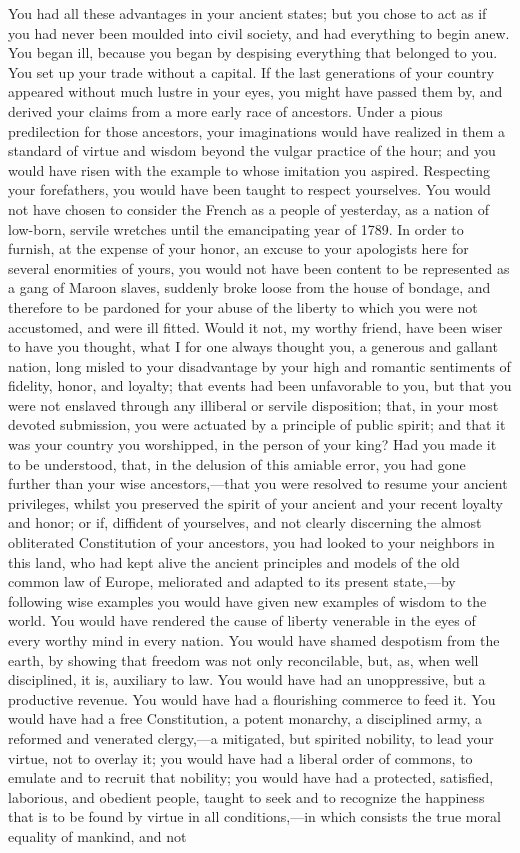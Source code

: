 You had all these advantages in your ancient states; but you chose to act as if you had never been moulded into civil society, and had everything to begin anew. You began ill, because you began by despising everything that belonged to you. You set up your trade without a capital. If the last generations of your country appeared without much lustre in your eyes, you might have passed them by, and derived your claims from a more early race of ancestors. Under a pious predilection for those ancestors, your imaginations would have realized in them a standard of virtue and wisdom beyond the vulgar practice of the hour; and you would have risen with the example to whose imitation you aspired. Respecting your forefathers, you would have been taught to respect yourselves. You would not have chosen to consider the French as a people of yesterday, as a nation of low-born, servile wretches until the emancipating year of 1789. In order to furnish, at the expense of your honor, an excuse to your apologists here for several enormities of yours, you would not have been content to be represented as a gang of Maroon slaves, suddenly broke loose from the house of bondage, and therefore to be pardoned for your abuse of the liberty to which you were not accustomed, and were ill fitted. Would it not, my worthy friend, have been wiser to have you thought, what I for one always thought you, a generous and gallant nation, long misled to your disadvantage by your high and romantic sentiments of fidelity, honor, and loyalty; that events had been unfavorable to you, but that you were not enslaved through any illiberal or servile disposition; that, in your most devoted submission, you were actuated by a principle of public spirit; and that it was your country you worshipped, in the person of your king? Had you made it to be understood, that, in the delusion of this amiable error, you had gone further than your wise ancestors,—that you were resolved to resume your ancient privileges, whilst you preserved the spirit of your ancient and your recent loyalty and honor; or if, diffident of yourselves, and not clearly discerning the almost obliterated Constitution of your ancestors, you had looked to your neighbors in this land, who had kept alive the ancient principles and models of the old common law of Europe, meliorated and adapted to its present state,—by following wise examples you would have given new examples of wisdom to the world. You would have rendered the cause of liberty venerable in the eyes of every worthy mind in every nation. You would have shamed despotism from the earth, by showing that freedom was not only reconcilable, but, as, when well disciplined, it is, auxiliary to law. You would have had an unoppressive, but a productive revenue. You would have had a flourishing commerce to feed it. You would have had a free Constitution, a potent monarchy, a disciplined army, a reformed and venerated clergy,—a mitigated, but spirited nobility, to lead your virtue, not to overlay it; you would have had a liberal order of commons, to emulate and to recruit that nobility; you would have had a protected, satisfied, laborious, and obedient people, taught to seek and to recognize the happiness that is to be found by virtue in all conditions,—in which consists the true moral equality of mankind, and not 